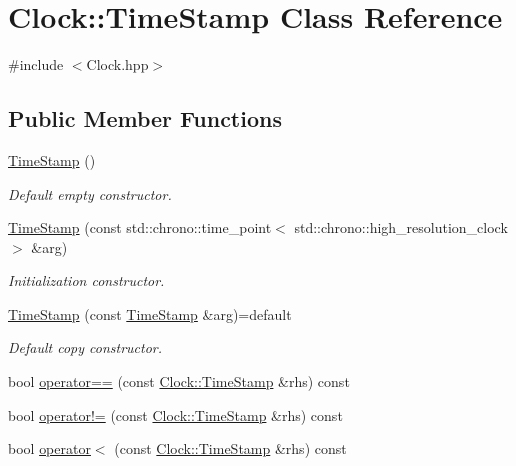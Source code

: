 \hypertarget{class_clock_1_1_time_stamp}{}\section{Clock\+:\+:Time\+Stamp Class Reference}
\label{class_clock_1_1_time_stamp}


{\ttfamily \#include $<$Clock.\+hpp$>$}

\subsection*{Public Member Functions}
\begin{DoxyCompactItemize}
\item 
\hyperlink{class_clock_1_1_time_stamp_aac68c3609da3356d7b02c7a35c892a23}{Time\+Stamp} ()
\begin{DoxyCompactList}\small\item\em Default empty constructor. \end{DoxyCompactList}\item 
\hyperlink{class_clock_1_1_time_stamp_af60062cc13bad94c9de46c93c7c9d4cd}{Time\+Stamp} (const std\+::chrono\+::time\+\_\+point$<$ std\+::chrono\+::high\+\_\+resolution\+\_\+clock $>$ \&arg)
\begin{DoxyCompactList}\small\item\em Initialization constructor. \end{DoxyCompactList}\item 
\hyperlink{class_clock_1_1_time_stamp_a9232a95105c59c2154373b6bd1459c87}{Time\+Stamp} (const \hyperlink{class_clock_1_1_time_stamp}{Time\+Stamp} \&arg)=default
\begin{DoxyCompactList}\small\item\em Default copy constructor. \end{DoxyCompactList}\item 
bool \hyperlink{class_clock_1_1_time_stamp_aa8fa25595ceb6d8300a31a475eeba2b7}{operator==} (const \hyperlink{class_clock_1_1_time_stamp}{Clock\+::\+Time\+Stamp} \&rhs) const 
\item 
bool \hyperlink{class_clock_1_1_time_stamp_a1786b6d74147561e4a4885d1a331c739}{operator!=} (const \hyperlink{class_clock_1_1_time_stamp}{Clock\+::\+Time\+Stamp} \&rhs) const 
\item 
bool \hyperlink{class_clock_1_1_time_stamp_af3226e1751b8863a17f344f70140818e}{operator$<$} (const \hyperlink{class_clock_1_1_time_stamp}{Clock\+::\+Time\+Stamp} \&rhs) const 
\item 

\end{DoxyCompactItemize}
